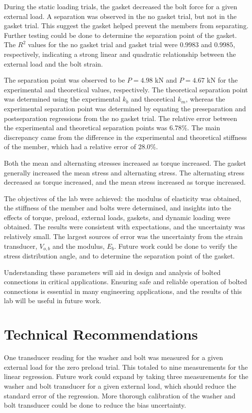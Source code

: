 During the static loading trials, the gasket decreased the bolt force for a given external load. A separation was observed in the no gasket trial, but not in the gasket trial. This suggest the gasket helped prevent the members from separating. Further testing could be done to determine the separation point of the gasket. The $R^2$ values for the no gasket trial and gasket trial were $0.9983$ and $0.9985$, respectively, indicating a strong linear and quadratic relationship between the external load and the bolt strain. 

The separation point was observed to be $P = 4.98$ kN and $P = 4.67$ kN for the experimental and theoretical values, respectively. The theoretical separation point was determined using the experimental $k_b$ and theoretical $k_m$, whereas the experimental separation point was determined by equating the preseparation and postseparation regressions from the no gasket trial. The relative error between the experimental and theoretical separation points was $6.78\%$. The main discrepancy came from the difference in the experimental and theoretical stiffness of the member, which had a relative error of $28.0\%$.

Both the mean and alternating stresses increased as torque increased. The gasket generally increased the mean stress and alternating stress. The alternating stress decreased as torque increased, and the mean stress increased as torque increased.

The objectives of the lab were achieved: the modulus of elasticity was obtained, the stiffness of the member and bolts were determined, and insights into the effects of torque, preload, external loads, gaskets, and dynamic loading were obtained. The results were consistent with expectations, and the uncertainty was relatively small. The largest sources of error was the uncertainty from the strain transducer, $V_{o, b}$ and the modulus, $E_b$. Future work could be done to verify the stress distribution angle, and to determine the separation point of the gasket.

Understanding these parameters will aid in design and analysis of bolted connections in critical applications. Ensuring safe and reliable operation of bolted connections is essential in many engineering applications, and the results of this lab will be useful in future work.

\section{Technical Recommendations}
One transducer reading for the washer and bolt was measured for a given external load for the zero preload trial. This totaled to nine measurements for the linear regression. Future work could expand by taking three measurements for the washer and bolt transducer for a given external load, which should reduce the standard error of the regression. More thorough calibration of the washer and bolt transducer could be done to reduce the bias uncertainty.

